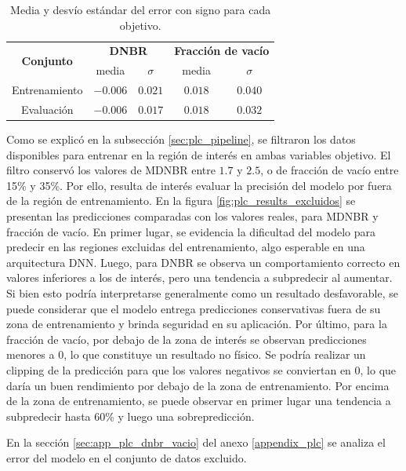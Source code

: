 \begin{table}[h]
	\centering
	\caption{Media y desvío estándar del error con signo para cada objetivo.}
	\begin{tabular}{c c c c c} 
        \toprule
        \multirow{2}{*}{\textbf{Conjunto}} & \multicolumn{2}{c}{\textbf{DNBR}} & \multicolumn{2}{c}{\textbf{Fracción de vacío}} \\
                & media     & $\sigma$  & media & $\sigma$  \\ \hline
        Entrenamiento & $-0.006$    & $0.021$     & $0.018$ & $0.040$     \\
        Evaluación    & $-0.006$    & $0.017$     & $0.018$ & $0.032$     \\
		\bottomrule
	\end{tabular}
	\label{tab:plc_errors_dnbr_vacio}
\end{table}

Como se explicó en la subsección \ref{sec:plc_pipeline}, se filtraron los datos disponibles para entrenar en la región de interés en ambas variables objetivo. El filtro conservó los valores de MDNBR entre $1.7$ y $2.5$, o de fracción de vacío entre 15\% y 35\%. Por ello, resulta de interés evaluar la precisión del modelo por fuera de la región de entrenamiento. En la figura \ref{fig:plc_results_excluidos} se presentan las predicciones comparadas con los valores reales, para MDNBR y fracción de vacío.
En primer lugar, se evidencia la dificultad del modelo para predecir en las regiones excluidas del entrenamiento, algo esperable en una arquitectura DNN.
Luego, para DNBR se observa un comportamiento correcto en valores inferiores a los de interés, pero una tendencia a subpredecir al aumentar. Si bien esto podría interpretarse generalmente como un resultado desfavorable, se puede considerar que el modelo entrega predicciones conservativas fuera de su zona de entrenamiento y brinda seguridad en su aplicación. Por último, para la fracción de vacío, por debajo de la zona de interés se observan predicciones menores a 0, lo que constituye un resultado no físico. Se podría realizar un clipping de la predicción para que los valores negativos se conviertan en 0, lo que daría un buen rendimiento por debajo de la zona de entrenamiento. Por encima de la zona de entrenamiento, se puede observar en primer lugar una tendencia a subpredecir hasta 60\% y luego una sobrepredicción. 

En la sección \ref{sec:app_plc_dnbr_vacio} del anexo \ref{appendix_plc} se analiza el error del modelo en el conjunto de datos excluido.

